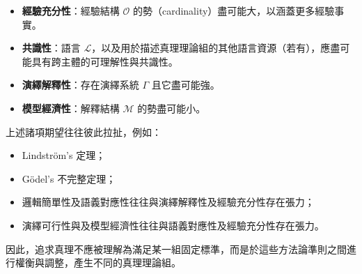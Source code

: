 \documentclass[a4paper,12pt]{article}
\begin{document}
\begin{itemize}
\begin{itemize}
\item 存在演繹系統 $\Gamma$ 且它是語義完整的（syntactically complete）；
\item $T$ 完整理論（complete theory）。
\end{itemize}
\item \textbf{經驗充分性}：經驗結構 $\mathcal{O}$ 的勢（cardinality）盡可能大，以涵蓋更多經驗事實。
\item \textbf{共識性}：語言 $\mathcal{L}$，以及用於描述真理理論組的其他語言資源（若有），應盡可能具有跨主體的可理解性與共識性。
\item \textbf{演繹解釋性}：存在演繹系統 $\Gamma$ 且它盡可能強。
\item \textbf{模型經濟性}：解釋結構 $\mathcal{M}$ 的勢盡可能小。
\end{itemize}
上述諸項期望往往彼此拉扯，例如：
\begin{itemize}
\item Lindström's 定理；
\item Gödel's 不完整定理；
\item 邏輯簡單性及語義對應性往往與演繹解釋性及經驗充分性存在張力；
\item 演繹可行性與及模型經濟性往往與語義對應性及經驗充分性存在張力。
\end{itemize}
因此，追求真理不應被理解為滿足某一組固定標準，而是於這些方法論準則之間進行權衡與調整，產生不同的真理理論組。
\end{document}
